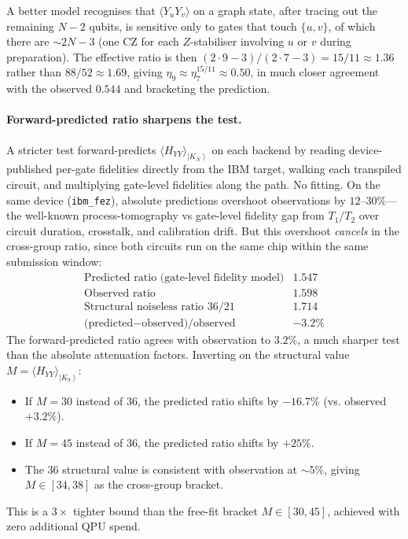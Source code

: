 \documentclass[11pt]{article}
\newcommand{\ket}[1]{\left|#1\right\rangle}
\begin{document}
A better model recognises that
$\langle Y_u Y_v\rangle$ on a graph state, after tracing out the
remaining $N-2$ qubits, is sensitive only to gates that touch
$\{u,v\}$, of which there are $\sim 2N - 3$ (one CZ for each
$Z$-stabiliser involving $u$ or $v$ during preparation).  The
effective ratio is then $(2 \cdot 9 - 3)/(2 \cdot 7 - 3) =
15/11 \approx 1.36$ rather than $88/52 \approx 1.69$, giving
$\eta_9 \approx \eta_7^{15/11} \approx 0.50$, in much closer
agreement with the observed $0.544$ and bracketing the prediction.

\paragraph{Forward-predicted ratio sharpens the test.}
A stricter test forward-predicts $\langle H_{YY}\rangle_{\ket{K_N}}$
on each backend by reading device-published per-gate fidelities
directly from the IBM target, walking each transpiled circuit, and
multiplying gate-level fidelities along the path.  No fitting.  On
the same device (\texttt{ibm\_fez}), absolute predictions overshoot
observations by $12$--$30\%$---the well-known process-tomography vs
gate-level fidelity gap from $T_1/T_2$ over circuit duration,
crosstalk, and calibration drift.  But this overshoot \emph{cancels}
in the cross-group ratio, since both circuits run on the same chip
within the same submission window:
\begin{equation}
  \label{eq:K9-ratio}
  \begin{array}{l|c}
    \text{Predicted ratio (gate-level fidelity model)} & 1.547 \\
    \text{Observed ratio} & 1.598 \\
    \text{Structural noiseless ratio } 36/21 & 1.714 \\
    \text{(predicted}-\text{observed)/observed} & -3.2\%
  \end{array}
\end{equation}
The forward-predicted ratio agrees with observation to $3.2\%$, a
much sharper test than the absolute attenuation factors.  Inverting
on the structural value $M = \langle H_{YY}\rangle_{\ket{K_9}}$:
\begin{itemize}
\item If $M = 30$ instead of $36$, the predicted ratio shifts by
  $-16.7\%$ (vs. observed $+3.2\%$).
\item If $M = 45$ instead of $36$, the predicted ratio shifts by
  $+25\%$.
\item The $36$ structural value is consistent with observation at
  $\sim 5\%$, giving $M \in [34, 38]$ as the cross-group bracket.
\end{itemize}
This is a $3\times$ tighter bound than the free-fit bracket
$M \in [30, 45]$, achieved with zero additional QPU spend.
\end{document}
